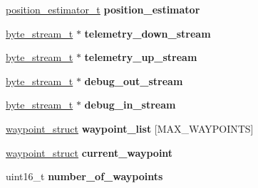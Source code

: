\begin{DoxyCompactItemize}
\item 
\hypertarget{structcentral__data__t_aa567ca94036771cf18c531e1a091aed4}{\hyperlink{structposition__estimator__t}{position\+\_\+estimator\+\_\+t} {\bfseries position\+\_\+estimator}}\label{structcentral__data__t_aa567ca94036771cf18c531e1a091aed4}

\item 
\hypertarget{structcentral__data__t_a25de964e6beb8dfd54ed791228d5009e}{\hyperlink{structbyte__stream__t}{byte\+\_\+stream\+\_\+t} $\ast$ {\bfseries telemetry\+\_\+down\+\_\+stream}}\label{structcentral__data__t_a25de964e6beb8dfd54ed791228d5009e}

\item 
\hypertarget{structcentral__data__t_ab4a46d9b880e612c904a6df468e805e8}{\hyperlink{structbyte__stream__t}{byte\+\_\+stream\+\_\+t} $\ast$ {\bfseries telemetry\+\_\+up\+\_\+stream}}\label{structcentral__data__t_ab4a46d9b880e612c904a6df468e805e8}

\item 
\hypertarget{structcentral__data__t_ab940a6a1f2029f035e377b4e2838c648}{\hyperlink{structbyte__stream__t}{byte\+\_\+stream\+\_\+t} $\ast$ {\bfseries debug\+\_\+out\+\_\+stream}}\label{structcentral__data__t_ab940a6a1f2029f035e377b4e2838c648}

\item 
\hypertarget{structcentral__data__t_a4ea6b11e6ad16f0fa26b82b3c46a71ec}{\hyperlink{structbyte__stream__t}{byte\+\_\+stream\+\_\+t} $\ast$ {\bfseries debug\+\_\+in\+\_\+stream}}\label{structcentral__data__t_a4ea6b11e6ad16f0fa26b82b3c46a71ec}

\item 
\hypertarget{structcentral__data__t_ae78cb4a69588f3643ce30a1f4664c06b}{\hyperlink{structwaypoint__struct}{waypoint\+\_\+struct} {\bfseries waypoint\+\_\+list} \mbox{[}M\+A\+X\+\_\+\+W\+A\+Y\+P\+O\+I\+N\+T\+S\mbox{]}}\label{structcentral__data__t_ae78cb4a69588f3643ce30a1f4664c06b}

\item 
\hypertarget{structcentral__data__t_ab06bce377e7448fc0c2869481010f17d}{\hyperlink{structwaypoint__struct}{waypoint\+\_\+struct} {\bfseries current\+\_\+waypoint}}\label{structcentral__data__t_ab06bce377e7448fc0c2869481010f17d}

\item 
\hypertarget{structcentral__data__t_a0358a7d1a55cb8de26e3a6abdf03c873}{uint16\+\_\+t {\bfseries number\+\_\+of\+\_\+waypoints}}\label{structcentral__data__t_a0358a7d1a55cb8de26e3a6abdf03c873}


\end{DoxyCompactItemize}
